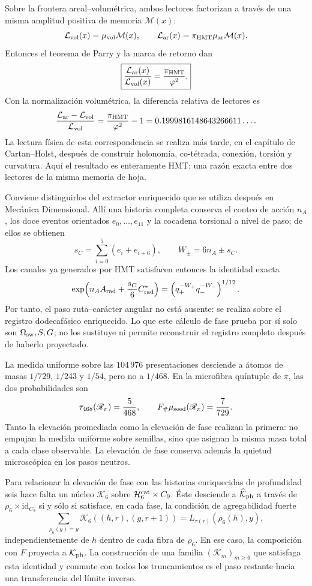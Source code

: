 Sobre la frontera areal--volumétrica, ambos lectores factorizan a través de
una misma amplitud positiva de memoria \(\mathcal M(x)\):
\[
 \mathcal L_{\rm vol}(x)=\mu_{\rm vol}\mathcal M(x),
 \qquad
 \mathcal L_{\rm ar}(x)=
 \pi_{\rm HMT}\mu_{\rm ar}\mathcal M(x).
\]
Entonces el teorema de Parry y la marca de retorno dan
\[
 \boxed{\displaystyle
 \frac{\mathcal L_{\rm ar}(x)}
 {\mathcal L_{\rm vol}(x)}
 =\frac{\pi_{\rm HMT}}{\varphi^2}.}
\]
Con la normalización volumétrica, la diferencia relativa de lectores es
\[
 \frac{\mathcal L_{\rm ar}-\mathcal L_{\rm vol}}
 {\mathcal L_{\rm vol}}
 =
 \frac{\pi_{\rm HMT}}{\varphi^2}-1
 =
 0.1999816148643266611\ldots.
\]
La lectura física de esta correspondencia se realiza más tarde, en el capítulo de
Cartan--Holst, después de construir holonomía, co-tétrada, conexión, torsión
y curvatura. Aquí el resultado es enteramente HMT: una razón exacta entre
dos lectores de la misma memoria de hoja.

Conviene distinguirlos del extractor enriquecido que se utiliza después en
Mecánica Dimensional. Allí una historia completa conserva el conteo de acción
\(n_A\), los doce eventos orientados \(e_0,\ldots,e_{11}\) y la cocadena
torsional a nivel de paso; de ellos se obtienen
\[
 s_C=\sum_{i=0}^{5}(e_i+e_{i+6}),
 \qquad
 W_\pm=6n_A\pm s_C.
\]
Los canales ya generados por HMT satisfacen entonces la identidad exacta
\[
 \exp\!\left(n_AA_{\rm rad}+\frac{s_C}{6}C^\ast_{\rm rad}\right)
 =\left(q_+^{-W_+}q_-^{-W_-}\right)^{1/12}.
\]
Por tanto, el paso ruta--carácter angular no está ausente: se realiza sobre
el registro dodecafásico enriquecido. Lo que este cálculo de fase prueba por sí
solo son \(\Omega_{\rm sw},S,G\); no los sustituye ni permite reconstruir el
registro completo después de haberlo proyectado.

La medida uniforme sobre las \(104\,976\) presentaciones desciende a átomos
de masas \(1/729\), \(1/243\) y \(1/54\), pero no a \(1/468\). En la
microfibra quíntuple de \(\pi\), las dos probabilidades son
\[
 \tau_{468}(\mathscr R_\pi)=\frac5{468},
 \qquad
 F_\#\mu_{\rm seed}(\mathscr R_\pi)=\frac7{729}.
\]
Tanto la elevación promediada como la elevación de fase realizan la primera: no
empujan la medida uniforme sobre semillas, sino que asignan la misma masa
total a cada clase observable. La elevación de fase conserva además la
quietud microscópica en los pasos neutros.

Para relacionar la elevación de fase con las historias enriquecidas de
profundidad seis hace falta un núcleo \(\mathcal K_6\) sobre
\(\mathcal H_6^{\rm cat}\times C_9\). Éste desciende a
\(\widehat{\mathcal K}_{\rm ph}\) a través de
\(\rho_6\times\mathrm{id}_{C_9}\) si y sólo si satisface, en cada fase, la
condición de agregabilidad fuerte
\[
 \sum_{\rho_6(g)=y}\mathcal K_6((h,r),(g,r+1))
 =L_{\tau(r)}(\rho_6(h),y),
\]
independientemente de \(h\) dentro de cada fibra de \(\rho_6\). En ese caso,
la composición con \(F\) proyecta a \(\mathcal K_{\rm ph}\). La construcción
de una familia \((\mathcal K_m)_{m\geq6}\) que satisfaga esta identidad y
conmute con todos los truncamientos es el paso restante hacia una
transferencia del límite inverso.

